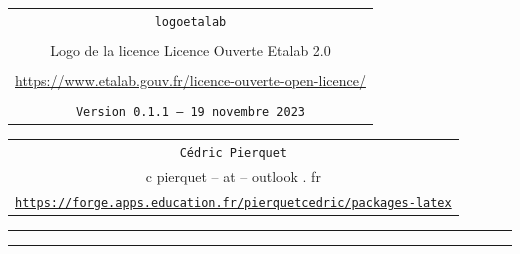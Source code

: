 \documentclass[french,11pt,a4paper]{article}
\def\TPversion{0.1.1}
\def\TPdate{19 novembre 2023}
\begin{document}
\pagestyle{fancy}

\thispagestyle{empty}

\begin{center}
	\begin{minipage}{0.88\linewidth}
	\begin{tcolorbox}[colframe=yellow,colback=yellow!15]
		\begin{center}
			\begin{tabular}{c}
				{\Huge \texttt{logoetalab}}\\
				\\
				{\LARGE Logo de la licence \og Licence Ouverte Etalab 2.0 \fg} \\
				\\
				\url{https://www.etalab.gouv.fr/licence-ouverte-open-licence/} \\
				\\
				{\small \texttt{Version \TPversion{} -- \TPdate}}
		\end{tabular}
		\end{center}
	\end{tcolorbox}
\end{minipage}
\end{center}

\begin{center}
	\begin{tabular}{c}
	\texttt{Cédric Pierquet}\\
	{\ttfamily c pierquet -- at -- outlook . fr}\\
	\texttt{\url{https://forge.apps.education.fr/pierquetcedric/packages-latex}}
\end{tabular}
\end{center}

\hrule


\hypertarget{matoc}{}

\tableofcontents

\vspace*{5mm}

\hrule

\vspace*{5mm}

\vfill
\end{document}
